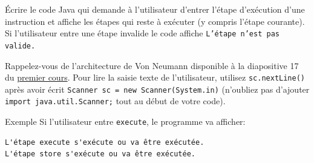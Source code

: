 \begin{Exercice}[5 minutes] 
    Écrire le code Java qui demande à l'utilisateur d'entrer l'étape d'exécution d'une instruction et affiche les étapes qui reste à exécuter (y compris l'étape courante). 
    Si l'utilisateur entre une étape invalide le code affiche \texttt{L'étape n'est pas valide.}

    \begin{conseil}
    Rappelez-vous de l'architecture de Von Neumann 
    disponible à la diapositive 
    17 du \href{https://moodle.unil.ch/pluginfile.php/3532625/mod_resource/content/12/1\%20\%E2\%80\%93\%20Computer\%20Architecture.pdf}{premier cours}. Pour lire 
    la saisie texte de l'utilisateur, utilisez \texttt{sc.nextLine()} après avoir écrit \texttt{Scanner sc = new Scanner(System.in)} (n'oubliez pas d'ajouter \texttt{import java.util.Scanner;} tout au début de votre code).
    \end{conseil}


   \begin{Example}{Exemple}
Si l'utilisateur entre \texttt{execute}, le programme va afficher:
\begin{lstlisting}[numbers=none, keywordstyle=\color{black}, stringstyle=\color{black}]
L'étape execute s'exécute ou va être exécutée. 
L'étape store s'exécute ou va être exécutée.
\end{lstlisting}
   \end{Example}

    \begin{solution}
         
    \end{solution}
    
\end{Exercice}

